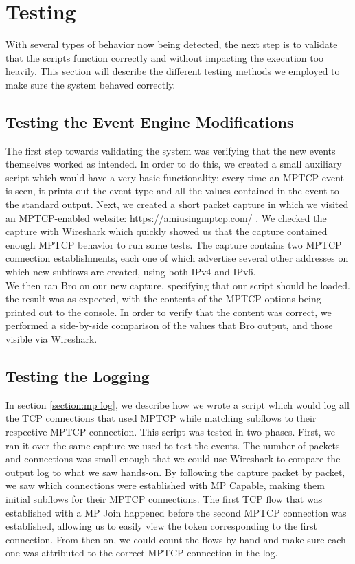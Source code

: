 

\chapter{Testing} \label{chap:test}
With several types of behavior now being detected, the next step is to validate that the scripts function correctly and without impacting the execution too heavily. This section will describe the different testing methods we employed to make sure the system behaved correctly.

\section{Testing the Event Engine Modifications}
The first step towards validating the system was verifying that the new events themselves worked as intended. In order to do this, we created a small auxiliary script which would have a very basic functionality: every time an MPTCP event is seen, it prints out the event type and all the values contained in the event to the standard output. Next, we created a short packet capture in which we visited an MPTCP-enabled website: \url {https://amiusingmptcp.com/} \cite{amiusing}. We checked the capture with Wireshark \citep{wireshark} which quickly showed us that the capture contained enough MPTCP behavior to run some tests. The capture contains two MPTCP connection establishments, each one of which advertise several other addresses on which new subflows are created, using both IPv4 and IPv6. \\

We then ran Bro on our new capture, specifying that our script should be loaded. the result was as expected, with the contents of the MPTCP options being printed out to the console. In order to verify that the content was correct, we performed a side-by-side comparison of the values that Bro output, and those visible via Wireshark.

\section{Testing the Logging}
In section \ref{section:mp log}, we describe how we wrote a script which would log all the TCP connections that used MPTCP while matching subflows to their respective MPTCP connection. This script was tested in two phases. First, we ran it over the same capture we used to test the events. The number of packets and connections was small enough that we could use Wireshark to compare the output log to what we saw hands-on. By following the capture packet by packet, we saw which connections were established with MP Capable, making them initial subflows for their MPTCP connections. The first TCP flow that was established with a MP Join happened before the second MPTCP connection was established, allowing us to easily view the token corresponding to the first connection. From then on, we could count the flows by hand and make sure each one was attributed to the correct MPTCP connection in the log. \\

